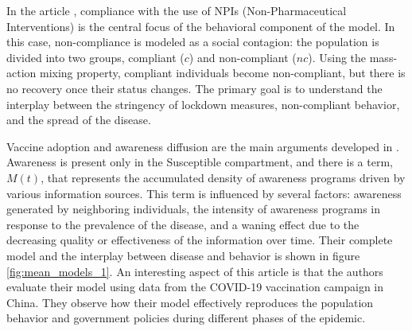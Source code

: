 In the article \cite{Bongarti2023}, compliance with the use of NPIs (Non-Pharmaceutical Interventions) is the central focus of the behavioral component of the model. In this case, non-compliance is modeled as a social contagion: the population is divided into two groups, compliant ($c$) and non-compliant ($nc$). Using the mass-action mixing property, compliant individuals become non-compliant, but there is no recovery once their status changes. The primary goal is to understand the interplay between the stringency of lockdown measures, non-compliant behavior, and the spread of the disease.


Vaccine adoption and awareness diffusion are the main arguments developed in \cite{Zuo2022}. Awareness is present only in the Susceptible compartment, and there is a term, $M(t)$, that represents the accumulated density of awareness programs driven by various information sources. This term is influenced by several factors: awareness generated by neighboring individuals, the intensity of awareness programs in response to the prevalence of the disease, and a waning effect due to the decreasing quality or effectiveness of the information over time. Their complete model and the interplay between disease and behavior is shown in figure  \ref{fig:mean_models_1}. 
An interesting aspect of this article is that the authors evaluate their model using data from the COVID-19 vaccination campaign in China. They observe how their model effectively reproduces the population behavior and government policies during different phases of the epidemic.

